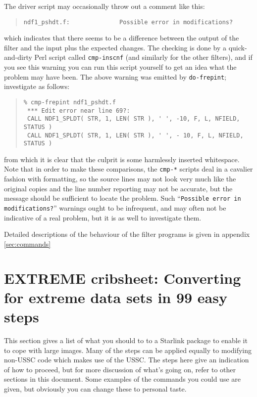 \documentclass[twoside,11pt]{article}
\newcommand{\htmlref}[2]{#1}
\renewcommand{\_}{\texttt{\symbol{95}}}
\newcommand{\xdofilter}[1]{\htmlref{{\tt do-#1}}{do-xxx}}
\newcommand{\file}[1]{{\tt #1}}
\newenvironment{squote}{\begin{quote}\begin{small}}{\end{small}\end{quote}}
\begin{document}
The driver script may occasionally throw out a comment like this:
\begin{squote}
\begin{verbatim}
ndf1_pshdt.f:              Possible error in modifications?          
\end{verbatim}
\end{squote}
which indicates that there seems to be a difference between
the output of the filter and the input plus the expected changes.
The checking is done by a quick-and-dirty Perl script called
\file{cmp-inscnf} (and similarly for the other filters),
and if you see this warning you can run this script yourself
to get an idea what the problem may have been. 
The above warning was emitted by \xdofilter{frepint}; investigate 
as follows:
\begin{squote}
\begin{verbatim}
% cmp-frepint ndf1_pshdt.f
 *** Edit error near line 69?:
 CALL NDF1_SPLDT( STR, 1, LEN( STR ), ' ', -10, F, L, NFIELD, STATUS )
 CALL NDF1_SPLDT( STR, 1, LEN( STR ), ' ', - 10, F, L, NFIELD, STATUS )
\end{verbatim}
\end{squote}
from which it is clear that the culprit is some harmlessly inserted
whitespace.
Note that in order to make these comparisons, the \file{cmp-*} scripts
deal in a cavalier fashion with formatting, so the source
lines may not look very much like the original copies and the line number
reporting may not be accurate, but the message
should be sufficient to locate the problem.
Such ``{\tt Possible error in modifications?}'' 
warnings ought to be infrequent, and may often not be indicative
of a real problem, but it is as well to investigate them.

Detailed descriptions of the behaviour of the filter programs is
given in appendix \ref{sec:commands}


\section{EXTREME cribsheet: Converting for extreme data sets in 99 easy 
                            steps\label{sec:cribsheet}}

This section gives a list of what you should to to
a Starlink package to enable it to cope with large images.
Many of the steps can be applied equally 
to modifying non-USSC code which makes use of the USSC.
The steps here give an indication of how to proceed, 
but for more discussion of what's going on, refer to other sections
in this document.
Some examples of the commands you could use are given, 
but obviously you can change these to personal taste.
\end{document}
